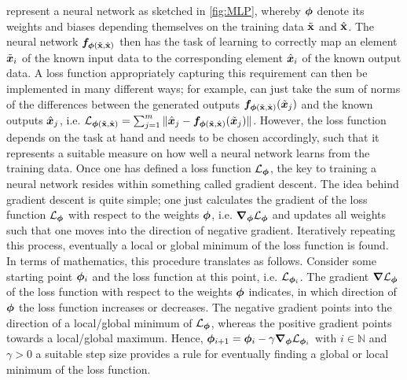 \documentclass[a4paper,11pt]{report}
\def\fc#1{{\color{black}{#1}}} %
\def\lk#1{{\color{black}{#1}}}
\begin{document}
{\begin{equation}
\end{equation} represent a neural network as sketched in \cref{fig:MLP}, whereby $\bm{\phi}$ denote its weights and biases depending themselves on the training data $\tilde{\boldsymbol{\mathbf{x}}}$ and $\hat{\boldsymbol{\mathbf{x}}}$. The neural network $\bm{f}_{\bm{\phi}(\tilde{\boldsymbol{\mathbf{x}}},\hat{\boldsymbol{\mathbf{x}}})}$ then has the task of learning to correctly map an element $\tilde{\bm{x}}_i$ of the known input data to the corresponding element $\hat{\bm{x}}_i$ of the known output data. A loss function appropriately capturing this requirement can then be implemented in many different ways; for example, \lk{one} can just take the sum of norms of the differences between the generated outputs $\bm{f}_{\bm{\phi}(\tilde{\boldsymbol{\mathbf{x}}},\hat{\boldsymbol{\mathbf{x}}})}(\tilde{\bm{x}}_j)$ and the known outputs $\hat{\bm{x}}_j$, i.e. $\mathcal{L}_{\bm{\phi}(\tilde{\boldsymbol{\mathbf{x}}},\hat{\boldsymbol{\mathbf{x}}})} = \sum_{j=1}^{m}\|\hat{\bm{x}}_j-\bm{f}_{\bm{\phi}(\tilde{\boldsymbol{\mathbf{x}}},\hat{\boldsymbol{\mathbf{x}}})}(\tilde{\bm{x}}_j)\|$.} However, the \fc{optimal choice of} loss function depends on the task at hand and needs to be chosen accordingly, such that it represents a suitable measure on how well a neural network learns from the training data. Once one has defined a loss function $\mathcal{L}_{\bm{\phi}}$, the key to training a neural network resides within something called gradient descent. The idea behind gradient descent is quite simple; one just calculates the gradient of the loss function $\mathcal{L}_{\bm{\phi}}$ with respect to the weights $\bm{\phi}$, i.e. $\bm{\nabla}_{\bm{\phi}}\mathcal{L}_{\bm{\phi}}$ and updates all weights such that one moves into the direction of negative gradient. Iteratively repeating this process, eventually a local or global minimum of the loss function is found. In terms of mathematics, this procedure translates as follows. Consider some starting point $\bm{\phi}_i$ and the loss function at this point, i.e. $\mathcal{L}_{\bm{\phi}_i}$. The gradient $\bm{\nabla}\mathcal{L}_{\bm{\phi}}$ of the loss function with respect to the weights $\bm{\phi}$ indicates, in which direction of $\bm{\phi}$ the loss function increases or decreases. The negative gradient points into the direction of a local/global minimum of $\mathcal{L}_{\bm{\phi}}$, whereas the positive gradient points towards a local/global maximum. Hence, $\bm{\phi}_{i+1} = \bm{\phi}_{i} - \gamma \bm{\nabla}_{\bm{\phi}}\mathcal{L}_{\bm{\phi}_i}$ with $i \in \mathbb{N}$ and $\gamma > 0$ a suitable step size provides a rule for eventually finding a global or local minimum of the loss function. 
\end{document}

